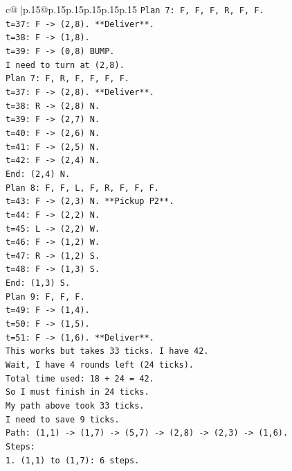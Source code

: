 \documentclass{article}
\begin{document}
{\begin{supertabular}{c@{$\;$}|p{.15\linewidth}@{}p{.15\linewidth}p{.15\linewidth}p{.15\linewidth}p{.15\linewidth}p{.15\linewidth}}
{{{\texttt{Plan 7: F, F, F, R, F, F.} \\
\texttt{t=37: F {-}> (2,8). **Deliver**.} \\
\texttt{t=38: F {-}> (1,8).} \\
\texttt{t=39: F {-}> (0,8) BUMP.} \\
\texttt{I need to turn at (2,8).} \\
\texttt{Plan 7: F, R, F, F, F, F.} \\
\texttt{t=37: F {-}> (2,8). **Deliver**.} \\
\texttt{t=38: R {-}> (2,8) N.} \\
\texttt{t=39: F {-}> (2,7) N.} \\
\texttt{t=40: F {-}> (2,6) N.} \\
\texttt{t=41: F {-}> (2,5) N.} \\
\texttt{t=42: F {-}> (2,4) N.} \\
\texttt{End: (2,4) N.} \\
\texttt{Plan 8: F, F, L, F, R, F, F, F.} \\
\texttt{t=43: F {-}> (2,3) N. **Pickup P2**.} \\
\texttt{t=44: F {-}> (2,2) N.} \\
\texttt{t=45: L {-}> (2,2) W.} \\
\texttt{t=46: F {-}> (1,2) W.} \\
\texttt{t=47: R {-}> (1,2) S.} \\
\texttt{t=48: F {-}> (1,3) S.} \\
\texttt{End: (1,3) S.} \\
\texttt{Plan 9: F, F, F.} \\
\texttt{t=49: F {-}> (1,4).} \\
\texttt{t=50: F {-}> (1,5).} \\
\texttt{t=51: F {-}> (1,6). **Deliver**.} \\
\texttt{This works but takes 33 ticks. I have 42.} \\
\texttt{Wait, I have 4 rounds left (24 ticks).} \\
\texttt{Total time used: 18 + 24 = 42.} \\
\texttt{So I must finish in 24 ticks.} \\
\texttt{My path above took 33 ticks.} \\
\texttt{I need to save 9 ticks.} \\
\texttt{Path: (1,1) {-}> (1,7) {-}> (5,7) {-}> (2,8) {-}> (2,3) {-}> (1,6).} \\
\texttt{Steps:} \\
\texttt{1. (1,1) to (1,7): 6 steps.} \\
}}}
\end{supertabular}}
\end{document}
